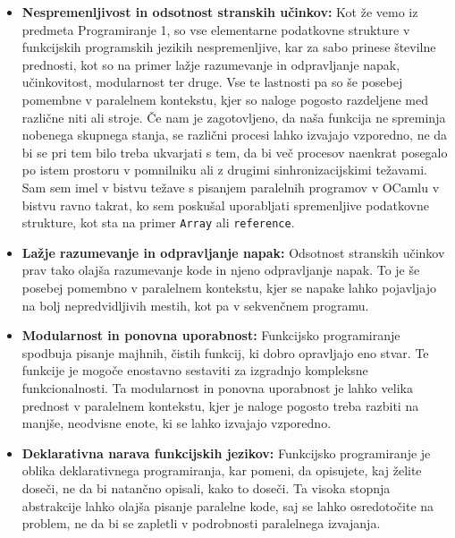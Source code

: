 \documentclass[mat1, tisk]{fmfdelo}
\begin{document}
\begin{itemize} \label{itemize:prednosti_funkcijskega_programiranja}
  \item \textbf{Nespremenljivost in odsotnost stranskih učinkov:} 
    Kot že vemo iz predmeta Programiranje 1, so vse 
    elementarne podatkovne strukture v funkcijskih programskih jezikih nespremenljive, kar za sabo prinese številne
    prednosti, kot so na primer lažje razumevanje in odpravljanje napak, učinkovitost, modularnost 
    ter druge. Vse te lastnosti pa so še posebej pomembne v paralelnem kontekstu, kjer so naloge pogosto razdeljene med
    različne niti ali stroje. Če nam je zagotovljeno, da naša funkcija ne spreminja nobenega skupnega stanja, se
    različni procesi lahko izvajajo vzporedno, ne da bi se pri tem bilo treba ukvarjati s tem, da bi več procesov
    naenkrat posegalo po istem prostoru v pomnilniku ali z drugimi sinhronizacijskimi težavami.
    Sam sem imel v bistvu težave s pisanjem paralelnih programov v OCamlu v bistvu ravno takrat, ko sem
    poskušal uporabljati spremenljive podatkovne strukture, kot sta na primer \texttt{Array} ali \texttt{reference}.

  \item \textbf{Lažje razumevanje in odpravljanje napak:} 
    Odsotnost stranskih učinkov prav tako olajša razumevanje kode in njeno odpravljanje napak. 
    To je še posebej pomembno v paralelnem kontekstu, kjer se napake lahko pojavljajo na bolj nepredvidljivih mestih,
    kot pa v sekvenčnem programu. 

  \item \textbf{Modularnost in ponovna uporabnost:} 
    Funkcijsko programiranje spodbuja pisanje majhnih, čistih funkcij, ki dobro opravljajo eno stvar. 
    Te funkcije je mogoče enostavno sestaviti za izgradnjo kompleksne funkcionalnosti. 
    Ta modularnost in ponovna uporabnost je lahko velika prednost v paralelnem kontekstu, 
    kjer je naloge pogosto treba razbiti na manjše, neodvisne enote, ki se lahko izvajajo vzporedno.

  \item \textbf{Deklarativna narava funkcijskih jezikov:} 
    Funkcijsko programiranje je oblika deklarativnega programiranja, kar pomeni, da opisujete, kaj želite doseči, 
    ne da bi natančno opisali, kako to doseči. Ta visoka stopnja abstrakcije lahko olajša pisanje paralelne kode, 
    saj se lahko osredotočite na problem, ne da bi se zapletli v podrobnosti paralelnega izvajanja.
\end{itemize}
\end{document}
